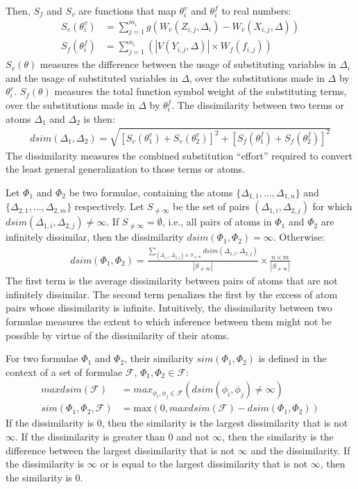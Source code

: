 \documentclass[EPiC]{easychair}
\begin{document}
Then, $S_f$ and $S_v$ are functions that map $\theta_i^v$ and 
$\theta_i^f$ to real numbers:
\begin{align}
S_v(\theta_i^v) &= \sum_{j=1}^{m_i} g(W_v(Z_{i,j},\Delta_i) - W_v(X_{i,j},\Delta)) \\
S_f(\theta_i^f) &= \sum_{j=1}^{n_i} (|V(Y_{i,j},\Delta)| \times W_f(f_{i,j}))
\end{align}
$S_v(\theta)$ measures the difference between the usage of substituting 
variables in $\Delta_i$ and the usage of substituted variables 
in $\Delta$, over the substitutions made in $\Delta$ by $\theta_i^v$.
$S_f(\theta)$ measures the total function symbol weight of the substituting 
terms, over the substitutions made in $\Delta$ by $\theta_i^f$.
The dissimilarity between two terms or atoms $\Delta_1$ and $\Delta_2$ is then:
\begin{align}
dsim(\Delta_1,\Delta_2) = \sqrt{[S_v(\theta_1^v)+S_v(\theta_2^v)]^2+[S_f(\theta_1^f)+S_f(\theta_2^f)]^2}
\end{align}
The dissimilarity measures the combined substitution ``effort'' required to 
convert the least general generalization to those terms or atoms.

Let $\Phi_1$ and $\Phi_2$ be two formulae, containing the atoms
$\{\Delta_{1,1},\dots,\Delta_{1,n}\}$ and 
$\{\Delta_{2,1},\dots,\Delta_{2,m}\}$ respectively.
Let $S_{\neq\infty}$ be the set of pairs $(\Delta_{1,i},\Delta_{2,j})$ 
for which $dsim(\Delta_{1,i},\Delta_{2,j}) \neq \infty$.
If $S_{\neq\infty} = \emptyset$, i.e., all pairs of atoms in $\Phi_1$ and 
$\Phi_2$ are infinitely dissimilar, then the dissimilarity 
$dsim(\Phi_1,\Phi_2) = \infty$.
Otherwise:
\begin{align}
dsim(\Phi_1,\Phi_2) = 
\frac{\sum_{(\Delta_{1,i},\Delta_{2,j}) \in S_{\neq\infty}}dsim(\Delta_{1,i},\Delta_{2,j})}
{|S_{\neq\infty}|}
\times
\frac{n \times m}{|S_{\neq\infty}|} 
\end{align}
The first term is the average dissimilarity between pairs of atoms that are 
not infinitely dissimilar.
The second term penalizes the first by the excess of atom pairs whose
dissimilarity is infinite.
Intuitively, the dissimilarity between two formulae measures the extent 
to which inference between them might not be possible by virtue of the 
dissimilarity of their atoms.

For two formulae $\Phi_1$ and $\Phi_2$, their similarity $sim(\Phi_1,\Phi_2)$
is defined in the context of a set of formulae $\mathcal{F}$, 
$\Phi_1,\Phi_2 \in \mathcal{F}$:
\begin{align}
maxdsim(\mathcal{F}) &= max_{\phi_i,\phi_j \in \mathcal{F}} (dsim(\phi_i,\phi_j) \neq \infty) \\
sim(\Phi_1,\Phi_2,\mathcal{F}) &= \textrm{max}(0, maxdsim(\mathcal{F}) - dsim(\Phi_1,\Phi_2))
\end{align}
If the dissimilarity is $0$, then the similarity is the largest dissimilarity 
that is not $\infty$.
If the dissimilarity is greater than $0$ and not $\infty$, then the similarity 
is the difference between the largest dissimilarity that is not $\infty$ and 
the dissimilarity.
If the dissimilarity is $\infty$ or is equal to the largest 
dissimilarity that is not $\infty$, then the similarity is $0$.
\end{document}
